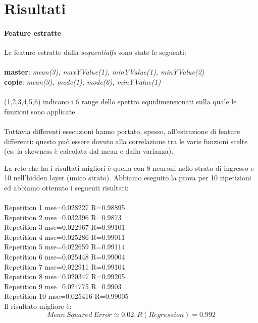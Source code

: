 \section{Risultati}
\paragraph{Feature estratte}
Le feature estratte dalla \textit{sequentialfs} sono state le seguenti:
\\\\
\textbf{master}: \textit{mean(3), maxYValue(1), minYValue(1), minYValue(2)}
\\
\textbf{copie}: \textit{mean(3), mode(1), mode(6), minYValue(1)}
\\\\(1,2,3,4,5,6) indicano i 6 range dello spettro equidimensionati sulla quale le funzioni sono applicate
\\\\
Tuttavia differenti esecuzioni hanno portato, spesso, all'estrazione di feature differenti: questo può essere dovuto alla correlazione tra le varie funzioni scelte (es. la skewness è calcolata dal mean e dalla varianza).

La rete che ha i risultati migliori è quella con 8 neuroni nello strato di ingresso e 10 nell'hidden layer (unico strato). Abbiamo eseguito la prova per 10 ripetizioni ed abbiamo ottenuto i seguenti risultati:
\\\\
Repetition 1 mse=0.028227 R=0.98895\\
Repetition 2 mse=0.032396 R=0.9873\\
Repetition 3 mse=0.022967 R=0.99101\\
Repetition 4 mse=0.025286 R=0.99011\\
Repetition 5 mse=0.022659 R=0.99114\\
Repetition 6 mse=0.025448 R=0.99004\\
Repetition 7 mse=0.022911 R=0.99104\\
Repetition 8 mse=0.020347 R=0.99205\\
Repetition 9 mse=0.024775 R=0.9903\\
Repetition 10 mse=0.025416 R=0.99005\\

Il risultato migliore è:
\[Mean\ Squared\ Error \simeq 0.02, R(Regression) = 0.992\]

